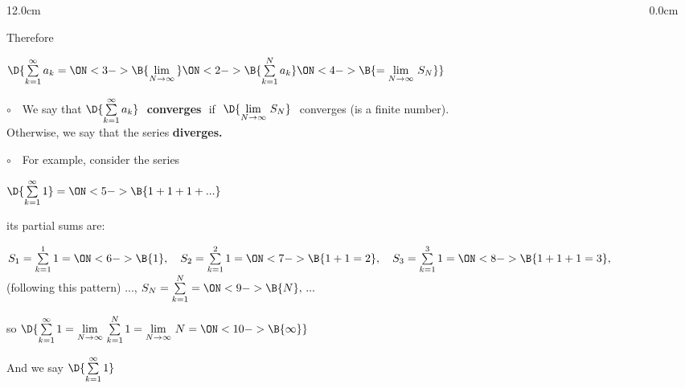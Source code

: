 \begin{frame}
\scriptsize
\begin{columns}
\begin{column}{12.0cm}

Therefore
\begin{center}
	$\D{\sum \limits_{k = 1}^{\infty} a_k = \ON<3->{\B{\lim \limits_{N \to \infty}\,}} \ON<2->{\B{\sum \limits_{k=1}^{N} a_k}} \ON<4->{\B{= \lim \limits_{N \to \infty}\, S_N}}}$
\end{center}

$\circ$ \,\, We say that $\D{\sum \limits_{k = 1}^{\infty} a_k}$ \,\,{\bf converges}\,\, if \,\,$\D{\lim \limits_{N \to \infty}\, S_N}$\,\, converges (is a finite number).  \\
\vspace{0.2cm}
Otherwise, we say that the series {\bf diverges.} \\

\vspace{0.2cm}

$\circ$ \,\, For example, consider the series

\vspace{0.2cm}

$\D{\sum \limits_{k=1}^{\infty} 1} = \ON<5->{\B{1 + 1 + 1 + ...}}$

\vspace{0.2cm}

its partial sums are: \\

\vspace{0.2cm}

$S_1 = \sum \limits_{k=1}^{1} 1 = \ON<6->{\B{1}},\quad 
 S_2 = \sum \limits_{k=1}^{2} 1 = \ON<7->{\B{1+1 = 2}},\quad 
 S_3 = \sum \limits_{k=1}^{3} 1 =\ON<8->{\B{1+1+1 = 3}},$ \\ 
\hspace{1.2cm}(following this pattern) ..., \quad 
$S_N = \sum \limits_{k=1}^{N} =\ON<9->{\B{N}}, \, ...$

\vspace{0.1cm}

so \quad $\D{\sum \limits_{k=1}^{\infty} 1 = \lim \limits_{N \to \infty}\, \sum \limits_{k=1}^{N} 1 = \lim \limits_{N \to \infty}\, N = \ON<10->{\B{\infty}}}$

\vspace{0.2cm}

And we say $\D{\sum \limits_{k=1}^{\infty} 1}$ 

\end{column}
\begin{column}{0.0cm}\end{column}
\end{columns}
\end{frame}

